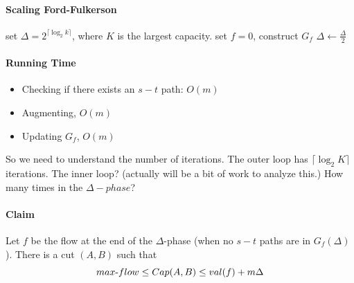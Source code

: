 \documentclass[12 pt]{article}
\begin{document}
        \paragraph{Scaling Ford-Fulkerson}
        \begin{algorithmic}
          \State set $\Delta=2^{\lceil \log_2 k \rceil}$, where $K$ is
          the largest capacity.
          \State set $f=0$, construct $G_f$
            \EndWhile
            \State $\Delta \gets \frac{\Delta}{2}$    
          \EndWhile
        \end{algorithmic}
        \paragraph{Running Time}
        \begin{itemize}
        \item Checking if there exists an $s-t$ path: $O(m)$
        \item Augmenting, $O(m)$
        \item Updating $G_f$, $O(m)$
        \end{itemize}
        So we need to understand the number of iterations.
        The outer loop has $\lceil \log_2 K \rceil$ iterations. The
        inner loop? (actually will be a bit of work to analyze this.)
        How many times in the $\Delta-phase$?
        \paragraph{Claim} Let $f$
        be the flow at the end of the $\Delta$-phase (when no $s-t$
        paths are in $G_f(\Delta)$). There is a cut $(A,B)$ such
        that $$max\hbox{-}flow \leq Cap(A,B) \leq val(f)+m\Delta$$
\end{document}
